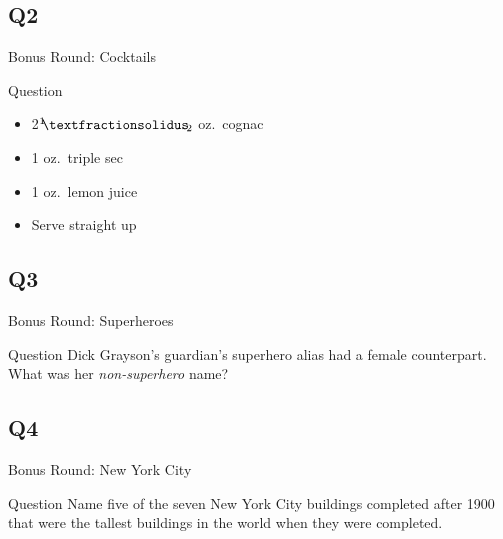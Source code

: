 \documentclass[11pt]{beamer}
\begin{document}
\subsection*{Q2}
\begin{frame}[t]{Bonus Round: Cocktails}
\begin{block}{Question}
\begin{itemize}
\item 2\({}^1{\mskip -5mu⁄\mskip -3mu}_2\) oz.\ cognac
\item 1 oz.\ triple sec
\item 1 oz.\ lemon juice
\item Serve straight up
\end{itemize}
\end{block}
\end{frame}
\subsection*{Q3}
\begin{frame}[t]{Bonus Round: Superheroes}
\begin{block}{Question}
Dick Grayson's guardian's superhero alias had a female counterpart. What was her \emph{non-superhero} name?
\end{block}
\end{frame}
\subsection*{Q4}
\begin{frame}[t]{Bonus Round: New York City}
\begin{block}{Question}
Name five of the seven New York City buildings completed after 1900 that were the tallest buildings in the world when they were completed. 
\end{block}
\end{frame}
\end{document}

